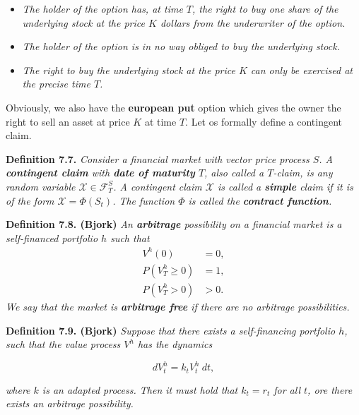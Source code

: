 \documentclass[a4paper,12pt,openany]{book}
\providecommand{\tightlist}{%
 \setlength{\itemsep}{0pt}\setlength{\parskip}{0pt}}
\begin{document}
\begin{itemize}
\tightlist
\item
  \emph{The holder of the option has, at time \(T\), the right to buy one share of the underlying stock at the price \(K\) dollars from the underwriter of the option.}
\item
  \emph{The holder of the option is in no way obliged to buy the underlying stock.}
\item
  \emph{The right to buy the underlying stock at the price \(K\) can only be exercised at the precise time \(T\).}
\end{itemize}

Obviously, we also have the \textbf{european put} option which gives the owner the right to sell an asset at price \(K\) at time \(T\). Let os formally define a contingent claim.

\textbf{Definition 7.7.} \emph{Consider a financial market with vector price process \(S\). A \textbf{contingent claim} with \textbf{date of maturity} \(T\), also called a \(T\)-claim, is any random variable \(\mathcal{X}\in\mathcal{F}_T^S\). A contingent claim \(\mathcal{X}\) is called a \textbf{simple} claim if it is of the form \(\mathcal{X} = \Phi(S_t)\). The function \(\Phi\) is called the \textbf{contract function}.}

\textbf{Definition 7.8. (Bjork)} \emph{An \textbf{arbitrage} possibility on a financial market is a self-financed portfolio \(h\) such that}
\begin{align*}
V^h(0)&=0,\tag{7.13}\\
P(V_T^h\ge0)&=1,\tag{7-14}\\
P(V_T^h>0)&>0.\tag{7.15}
\end{align*}
\emph{We say that the market is \textbf{arbitrage free} if there are no arbitrage possibilities.}

\textbf{Definition 7.9. (Bjork)} \emph{Suppose that there exists a self-financing portfolio \(h\), such that the value process \(V^h\) has the dynamics}

\[
d V_t^h=k_tV_t^h\ dt,\tag{7.16}
\]

\emph{where \(k\) is an adapted process. Then it must hold that \(k_t=r_t\) for all \(t\), ore there exists an arbitrage possibility.}
\end{document}
